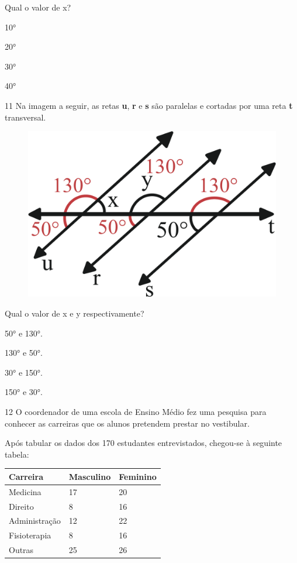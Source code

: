Qual o valor de x?

\begin{escolha}
  
  \item 10°

  \item 20°

  \item 30° 
  
  \item 40° 

\end{escolha}

\num{11} Na imagem a seguir, as retas \textbf{u}, \textbf{r} e \textbf{s} são paralelas
e cortadas por uma reta \textbf{t} transversal.

\begin{figure}[htpb!]
\centering
\includegraphics[width=.4\textwidth]{./ilustras-mat/Simulado_1-atividade_11_resposta.png}
\end{figure}

Qual o valor de x e y respectivamente?

\begin{escolha}

  \item 50° e 130°.

  \item 130° e 50°.

  \item 30° e 150°.

  \item 150° e 30°.

\end{escolha}

\num{12} O coordenador de uma escola de Ensino Médio fez uma pesquisa para
conhecer as carreiras que os alunos pretendem prestar no vestibular.

Após tabular os dados dos 170 estudantes entrevistados, chegou-se à
seguinte tabela:

\begin{longtable}[]{@{}lll@{}}
\toprule
Carreira & Masculino & Feminino\tabularnewline
\midrule
\endhead
Medicina & 17 & 20\tabularnewline
Direito & 8 & 16\tabularnewline
Administração & 12 & 22\tabularnewline
Fisioterapia & 8 & 16\tabularnewline
Outras & 25 & 26\tabularnewline
\bottomrule
\end{longtable}

